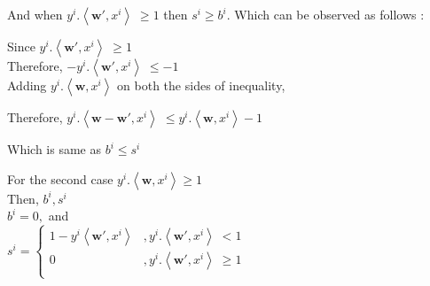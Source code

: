 \documentclass[a4paper,11pt]{article}
\begin{document}
\begin{mlsolution}
And when \begin{math}y^{i}.\left \langle \textbf{w}{}', x^{i} \right \rangle \; \geq  1\end{math}
 then \; \begin{math} s^{i} \geq b^{i}\end{math}. Which can be observed as follows :
 
Since \begin{math} y^{i}.\left \langle \textbf{w}{}', x^{i} \right \rangle \; \geq  1 \end{math} \\
Therefore, \begin{math} - y^{i}.\left \langle \textbf{w}{}', x^{i} \right \rangle \; \leq  -1 \end{math}\\

Adding \begin{math} y^{i}.\left \langle \textbf{w}, x^{i} \right \rangle \end{math} on both the sides of inequality,

Therefore, \begin{math} y^{i}.\left \langle \textbf{w} - \textbf{w}{}', x^{i} \right \rangle \; \leq  y^{i}.\left \langle \textbf{w}, x^{i} \right \rangle - 1 \end{math}

Which is same as \begin{math} b^{i} \leq s^{i} \end{math}

For the second case \begin{math}
y^{i}.\left \langle \textbf{w}, x^{i} \right \rangle \geq 1
\end{math}\\

Then, \begin{math}b^{i}, s^{i}\end{math}\\

\begin{math}
b^{i} = 0 ,
\end{math} and\\

\begin{math}
s^{i} = \left\{\begin{matrix}
1 - y^{i}\left \langle \textbf{w}{}', x^{i}\right \rangle & ,y^{i}.\left \langle \textbf{w}{}', x^{i} \right \rangle \; <  1\\ 
0 & ,y^{i}.\left \langle \textbf{w}{}', x^{i}\right \rangle \; \geq  1\\ \end{matrix}\right.
\end{math}\\ 


\end{mlsolution}
\end{document}
